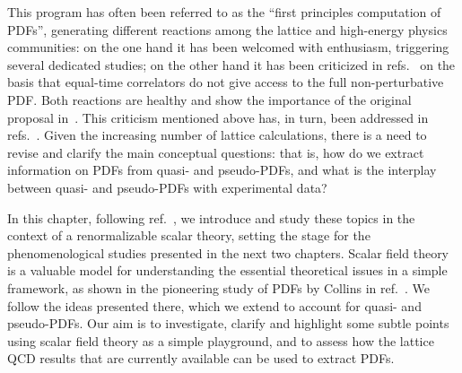 %
This program has often been referred to as the ``first
principles computation of PDFs'', generating different reactions among the
lattice and high-energy physics communities: on the one hand it has been
welcomed with enthusiasm, triggering several dedicated studies; on the other
hand it has been criticized in refs.~\cite{Rossi:2017muf,Rossi:2018zkn} on the
basis that equal-time correlators do not give access to the full
non-perturbative PDF. Both reactions are healthy and show the importance of the
original proposal in~\cite{PhysRevLett.110.262002}. This criticism mentioned
above has, in turn, been addressed in
refs.~\cite{Radyushkin:2018nbf,Karpie:2018zaz}. Given the increasing number of
lattice calculations, there is a need to revise and clarify the main conceptual
questions: that is, how do we extract information on PDFs from quasi- and
pseudo-PDFs, and what is the interplay between quasi- and pseudo-PDFs with
experimental data?

In this chapter, following ref.~\cite{DelDebbio:2020cbz}, we introduce and study these topics in the context of a renormalizable scalar
theory, setting the stage for the phenomenological studies presented in the next two chapters.
Scalar field theory is a valuable model for understanding the essential
theoretical issues in a simple framework, as shown in the pioneering study of
PDFs by Collins in ref.~\cite{Collins:1980ui}. We follow the ideas presented
there, which we extend to account for quasi- and pseudo-PDFs. Our aim is to
investigate, clarify and highlight some subtle points using scalar field theory
as a simple playground, and to assess how the lattice QCD results that are
currently available can be used to extract PDFs. 


